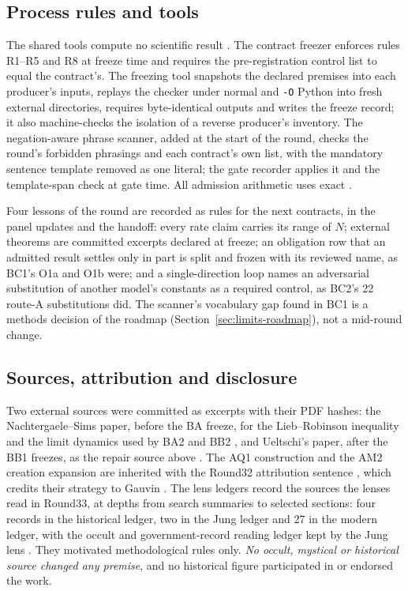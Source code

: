 \subsection{Process rules and tools}
\label{sec:history-rules}
The shared tools compute no scientific result \cite{r33contracts}. The
contract freezer enforces rules R1--R5 and R8 at freeze time and requires
the pre-registration control list to equal the contract's. The freezing tool
snapshots the declared premises into each producer's inputs, replays the
checker under normal and \texttt{-O} Python into fresh external directories,
requires byte-identical outputs and writes the freeze record; it also
machine-checks the isolation of a reverse producer's inventory. The
negation-aware phrase scanner, added at the start of the round, checks the
round's forbidden phrasings and each contract's own list, with the mandatory
sentence template removed as one literal; the gate recorder applies it and the
template-span check at gate time. All admission arithmetic uses exact
.

Four lessons of the round are recorded as rules for the next contracts, in
the panel updates and the handoff: every rate claim carries its range of $N$;
external theorems are committed excerpts declared at freeze; an obligation
row that an admitted result settles only in part is split and frozen with its
reviewed name, as BC1's O1a and O1b were; and a single-direction loop names an
adversarial substitution of another model's constants as a required control,
as BC2's 22 route-A substitutions did. The scanner's vocabulary gap found in
BC1 is a methods decision of the roadmap (Section~\ref{sec:limits-roadmap}),
not a mid-round change.

\subsection{Sources, attribution and disclosure}
\label{sec:history-sources}
Two external sources were committed as excerpts with their PDF hashes: the
Nachtergaele--Sims paper, before the BA freeze, for the Lieb--Robinson
inequality and the limit dynamics used by BA2 and BB2 \cite{ns}, and
Ueltschi's paper, after the BB1 freezes, as the repair source above
\cite{ueltschi}. The AQ1 construction and the AM2 creation expansion are
inherited with the Round32 attribution sentence \cite{r32add}, which credits
their strategy to Gauvin \cite{gauvin}. The lens ledgers record the sources
the lenses read in Round33, at depths from search summaries to selected
sections: four records in the historical ledger, two in the Jung ledger and
27 in the modern ledger, with the occult and government-record reading ledger
kept by the Jung lens \cite{r33lenses,r33occult}. They motivated
methodological rules only. \emph{No occult, mystical or historical source
changed any premise}, and no historical figure participated in or endorsed
the work.


